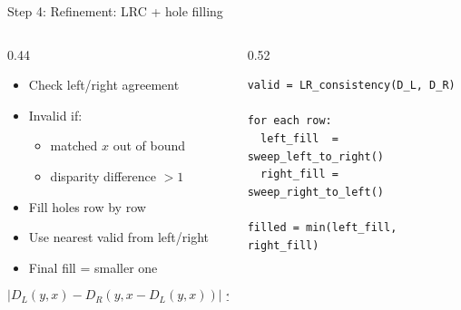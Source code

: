 \documentclass[aspectratio=169,11pt]{beamer}
\begin{document}
\begin{frame}[fragile]{Step 4: Refinement: LRC + hole filling}
\begin{columns}[T,totalwidth=\textwidth]
\begin{column}{0.44\textwidth}
\begin{itemize}
    \item Check left/right agreement
    \item Invalid if:
    \begin{itemize}
        \item matched $x$ out of bound
        \item disparity difference $>1$
    \end{itemize}
    \item Fill holes row by row
    \item Use nearest valid from left/right
    \item Final fill = smaller one
\end{itemize}
\[
|D_L(y,x)-D_R(y,x-D_L(y,x))|\le 1
\]
\end{column}

\begin{column}{0.52\textwidth}
\scriptsize
\begin{verbatim}
valid = LR_consistency(D_L, D_R)

for each row:
  left_fill  = sweep_left_to_right()
  right_fill = sweep_right_to_left()

filled = min(left_fill, right_fill)
\end{verbatim}
\end{column}
\end{columns}
\end{frame}



\end{document}
